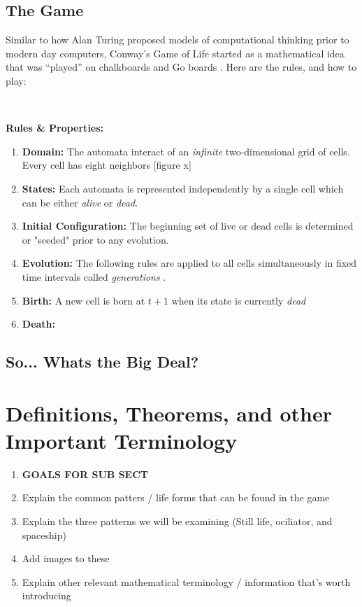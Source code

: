 \documentclass{article}
\theoremstyle{definition}
\theoremstyle{plain}
\theoremstyle{plain}
\begin{document}
\subsection{The Game}
Similar to how Alan Turing proposed models of computational thinking prior to modern day computers, Conway's Game of Life started as a mathematical idea that was “played” on chalkboards and Go boards \cite{Izhikevich_Conway_Seth}. Here are the rules, and how to play: 

\

\textbf{Rules \& Properties: }
\begin{enumerate}
  \item \textbf{Domain: } The automata interact of an \textit{infinite} two-dimensional grid of cells. Every cell has eight neighbors \cite{Izhikevich_Conway_Seth}[figure x]
  \item \textbf{States: } Each automata is represented independently by a single cell which can be either \textit{alive} or \textit{dead}.
  \item \textbf{Initial Configuration: } The beginning set of live or dead cells is determined or "seeded" prior to any evolution.
  \item \textbf{Evolution: } The following rules are applied to all cells simultaneously in fixed time intervals called \textit{generations} \cite{Bontes2019}.
  \item \textbf{Birth: } A new cell is born at $t + 1$ when its state is currently \textit{dead}
  \item \textbf{Death: } 
\end{enumerate}

\subsection{So... Whats the Big Deal?}
\section{Definitions, Theorems, and other Important Terminology}
\begin{enumerate}
  \item[] \textbf{GOALS FOR SUB SECT}
  \item Explain the common patters / life forms that can be found in the game
  \item Explain the three patterns we will be examining (Still life, ociliator, and spaceship)
  \item Add images to these 
  \item Explain other relevant mathematical terminology / information that's worth introducing 

\end{enumerate}
\end{document}
